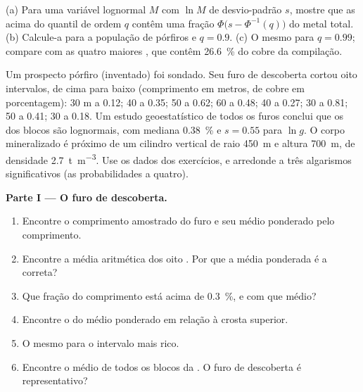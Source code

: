 \begin{exercise}[$\star\star\star$]\label{exo:b2:ore-deposits:12}
(a) Para uma variável lognormal $M$ com $\ln M$ de desvio-padrão $s$, mostre que as  acima
do quantil de ordem $q$ contêm uma fração $\Phi\bigl(s - \Phi^{-1}(q)\bigr)$ do metal total.
(b) Calcule-a para a população de pórfiros e $q = 0.9$. (c) O mesmo para $q = 0.99$; compare com
as quatro maiores , que contêm \qty{26.6}{\percent} do cobre da compilação.
\end{exercise}

\begin{problem}\label{pb:b2:ore-deposits:1}
Um prospecto pórfiro (inventado) foi sondado. Seu furo de descoberta cortou oito intervalos, de cima
para baixo (comprimento em metros,  de cobre em porcentagem): 30 m a 0.12; 40 a 0.35; 50 a 0.62; 60
a 0.48; 40 a 0.27; 30 a 0.81; 50 a 0.41; 30 a 0.18. Um estudo geoestatístico de todos os furos
conclui que os  dos blocos são lognormais, com mediana \qty{0.38}{\percent} e $s = 0.55$ para
$\ln g$. O corpo mineralizado é próximo de um cilindro vertical de raio \qty{450}{m} e altura
\qty{700}{m}, de densidade \qty{2.7}{t.m^{-3}}. Use os dados dos exercícios, e arredonde a três
algarismos significativos (as probabilidades a quatro).

\noindent\textbf{Parte I --- O furo de descoberta.}
\begin{enumerate}
  \item Encontre o comprimento amostrado do furo e seu  médio ponderado pelo comprimento.
  \item Encontre a média aritmética dos oito . Por que a média ponderada é a correta?
  \item Que fração do comprimento está acima de \qty{0.3}{\percent}, e com que  médio?
  \item Encontre o  do  médio ponderado em relação à crosta superior.
  \item O mesmo para o intervalo mais rico.
  \item Encontre o  médio de todos os blocos da . O furo de descoberta é representativo?
\end{enumerate}


\end{problem}
